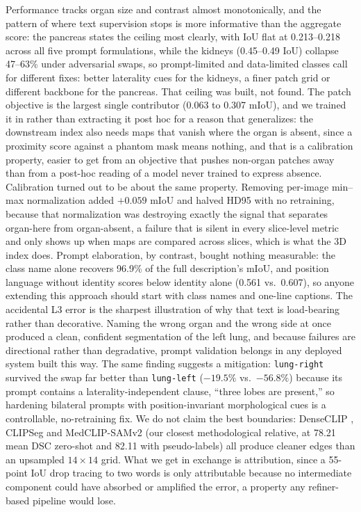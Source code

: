 \documentclass[10pt]{article}
\newcommand{\org}[1]{\texttt{#1}}
\begin{document}
Performance tracks organ size and contrast almost monotonically, and the
pattern of where text supervision stops is more informative than the aggregate
score: the pancreas states the ceiling most clearly, with IoU flat at
0.213--0.218 across all five prompt formulations, while the kidneys
(0.45--0.49 IoU) collapse 47--63\% under adversarial swaps, so prompt-limited
and data-limited classes call for different fixes: better laterality cues for
the kidneys, a finer patch grid or different backbone for the pancreas. That
ceiling was built, not found. The patch objective is the largest single
contributor (0.063 to 0.307 mIoU), and we trained it in rather than extracting
it post hoc for a reason that generalizes: the downstream index also needs
maps that vanish where the organ is absent, since a proximity score against a
phantom mask means nothing, and that is a calibration property, easier to get
from an objective that pushes non-organ patches away than from a post-hoc
reading of a model never trained to express absence. Calibration turned out
to be about the same property. Removing per-image min--max normalization
added $+0.059$ mIoU and halved HD95 with no retraining, because that
normalization was destroying exactly the signal that separates organ-here
from organ-absent, a failure that is silent in every slice-level metric and
only shows up when maps are compared across slices, which is what the 3D
index does. Prompt elaboration, by contrast, bought nothing measurable: the
class name alone recovers 96.9\% of the full description's mIoU, and position
language without identity scores below identity alone (0.561 vs.\ 0.607), so
anyone extending this approach should start with class names and one-line
captions. The accidental L3 error is the sharpest illustration of why that
text is load-bearing rather than decorative. Naming the wrong organ and the
wrong side at once produced a clean, confident segmentation of the left lung,
and because failures are directional rather than degradative, prompt
validation belongs in any deployed system built this way. The same finding
suggests a mitigation: \org{lung-right} survived the swap far better than
\org{lung-left} ($-19.5\%$ vs.\ $-56.8\%$) because its prompt contains a
laterality-independent clause, ``three lobes are present,'' so hardening
bilateral prompts with position-invariant morphological cues is a
controllable, no-retraining fix. We do not claim the best boundaries:
DenseCLIP \cite{rao2022denseclip}, CLIPSeg \cite{lueddecke2022clipseg} and
MedCLIP-SAMv2 \cite{koleilat2025medclipsamv2, kirillov2023sam} (our closest
methodological relative, at 78.21 mean DSC zero-shot and 82.11 with
pseudo-labels) all produce cleaner edges than an upsampled $14\times14$ grid.
What we get in exchange is attribution, since a 55-point IoU drop tracing to
two words is only attributable because no intermediate component could have
absorbed or amplified the error, a property any refiner-based pipeline would
lose.
\end{document}
